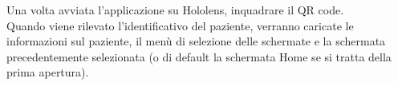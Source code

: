 Una volta avviata l'applicazione su Hololens, inquadrare il QR code. \\
\newline Quando viene rilevato l'identificativo del paziente, verranno caricate le informazioni sul paziente, il menù di selezione delle schermate e la schermata precedentemente selezionata (o di default la schermata Home se si tratta della prima apertura).